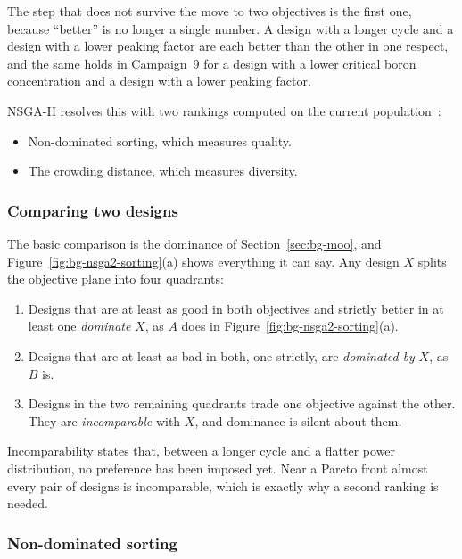 The step that does not survive the move to two objectives is the first
one, because ``better'' is no longer a single number. A design with a
longer cycle and a design with a lower peaking factor are each better
than the other in one respect, and the same holds in Campaign~9 for a
design with a lower critical boron concentration and a design with a
lower peaking factor.

NSGA-II resolves this with two rankings computed on the current
population~\cite{deb_nsga2_2002,deb_2001}:

\begin{itemize}
  \item Non-dominated sorting, which measures quality.

  \item The crowding distance, which measures diversity.
\end{itemize}

\subsubsection*{Comparing two designs}

The basic comparison is the dominance of Section~\ref{sec:bg-moo}, and
Figure~\ref{fig:bg-nsga2-sorting}(a) shows everything it can say. Any
design $X$ splits the objective plane into four quadrants:

\begin{enumerate}
  \item Designs that are at least as good in both objectives and
        strictly better in at least one \emph{dominate} $X$, as $A$ does
        in Figure~\ref{fig:bg-nsga2-sorting}(a).

  \item Designs that are at least as bad in both, one strictly, are
        \emph{dominated by} $X$, as $B$ is.

  \item Designs in the two remaining quadrants trade one objective
        against the other. They are \emph{incomparable} with $X$, and
        dominance is silent about them.
\end{enumerate}

Incomparability states that, between a longer cycle and a flatter power
distribution, no preference has been imposed yet. Near a Pareto front
almost every pair of designs is incomparable, which is exactly why a
second ranking is needed.

\subsubsection*{Non-dominated sorting}

